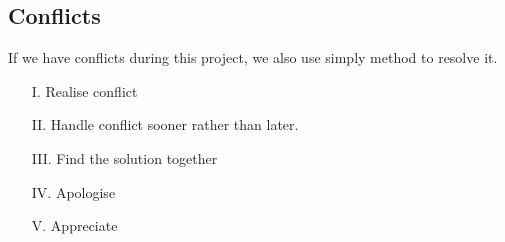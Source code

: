 \documentclass[11pt]{article}
\begin{document}
\subsection{Conflicts}
If we have conflicts during this project, we also use simply method to resolve it. 
\begin{itemize}
\item[I. ]Realise conflict
\item[II. ] Handle conflict sooner rather than later.
\item[III. ] Find the solution together
\item[IV. ] Apologise
\item[V. ] Appreciate
\end{itemize}
\end{document}

